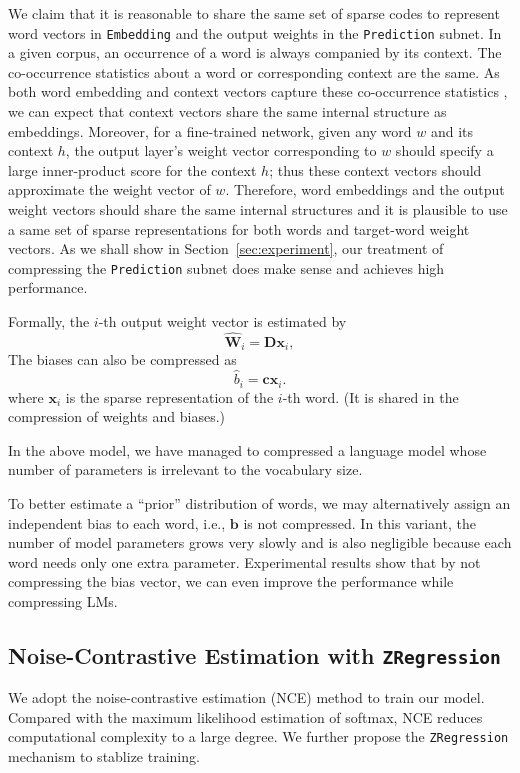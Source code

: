 \documentclass[11pt]{article}
\renewcommand{\vector}[1]{\bm{#1}}
\def\Embedding{\texttt{Embedding}}
\def\Prediction{\texttt{Prediction}}
\begin{document}
We claim that it is reasonable to share the same set of sparse codes to represent word vectors in \Embedding{} and the output weights in the \Prediction{} subnet. In a given corpus, an occurrence of a word is always companied by its context.
The co-occurrence statistics about a word or corresponding context are the same.
As both word embedding and context vectors capture these co-occurrence statistics
\cite{Levy:2014wb}, we can expect that context vectors share the same internal structure as embeddings.
Moreover, for a fine-trained network, given any word $w$ and its context $h$, the output layer's weight vector corresponding to $w$ should specify a large inner-product score for
the context $h$; thus these context vectors should approximate the
weight vector of $w$.
Therefore, word embeddings and the output weight vectors should share the same internal structures and  it is plausible to use a same set of sparse representations for both words and target-word weight vectors.
As we shall show in Section~\ref{sec:experiment}, our treatment of compressing the \Prediction{} subnet does make sense and achieves high performance.

Formally, the $i$-th output weight vector is estimated by
\begin{equation}
\hat{\vector{W}}_i = \vector{D} \vector{x}_i, \label{eq:sp2detector}
\end{equation}
The biases can also be compressed as
\begin{equation}
\hat{b}_i = \vector{c} \vector{x}_i. \label{eq:sp2detector_bias}
\end{equation}
where $\vector{x}_i$ is the sparse representation of the $i$-th word. (It is shared in the compression of weights and biases.)

In the above model, we have managed to compressed a language model whose number of parameters is
irrelevant to the vocabulary size.

To better estimate a ``prior'' distribution of words, we may alternatively assign an independent bias  to each word, i.e., $\vector{b}$ is not compressed. In this variant, the number of model parameters grows very slowly and is also negligible because each word needs only one extra parameter. Experimental results show that by not compressing the bias vector, we can even improve the performance while compressing LMs.

\subsection{Noise-Contrastive Estimation with \texttt{ZRegression}}\label{ss:NCE}
We adopt the noise-contrastive estimation (NCE) method to train our model.
Compared with the maximum likelihood estimation of softmax, NCE reduces computational complexity to a large degree.
We further propose the \texttt{ZRegression} mechanism to stablize training.
\end{document}
